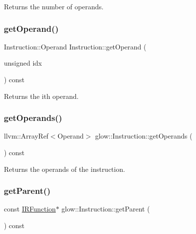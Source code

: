 \begin{DoxyReturn}{Returns}
the number of operands. 
\end{DoxyReturn}
\mbox{\label{classglow_1_1_instruction_ad8c63e8f5be507967615ef7247580926}} 
\subsubsection{\texorpdfstring{get\+Operand()}{getOperand()}}
{\footnotesize\ttfamily Instruction\+::\+Operand Instruction\+::get\+Operand (\begin{DoxyParamCaption}\item[{unsigned}]{idx }\end{DoxyParamCaption}) const}

\begin{DoxyReturn}{Returns}
the ith operand. 
\end{DoxyReturn}
\mbox{\label{classglow_1_1_instruction_a5ae3498b8bd63edb56057006673a37da}} 
\subsubsection{\texorpdfstring{get\+Operands()}{getOperands()}}
{\footnotesize\ttfamily llvm\+::\+Array\+Ref$<$Operand$>$ glow\+::\+Instruction\+::get\+Operands (\begin{DoxyParamCaption}{ }\end{DoxyParamCaption}) const\hspace{0.3cm}{\ttfamily [inline]}}

\begin{DoxyReturn}{Returns}
the operands of the instruction. 
\end{DoxyReturn}
\mbox{\label{classglow_1_1_instruction_a8d10bad794e192db6315a4372fbe829c}} 
\subsubsection{\texorpdfstring{get\+Parent()}{getParent()}}
{\footnotesize\ttfamily const \hyperlink{classglow_1_1_i_r_function}{I\+R\+Function}$\ast$ glow\+::\+Instruction\+::get\+Parent (\begin{DoxyParamCaption}{ }\end{DoxyParamCaption}) const\hspace{0.3cm}{\ttfamily [inline]}}

